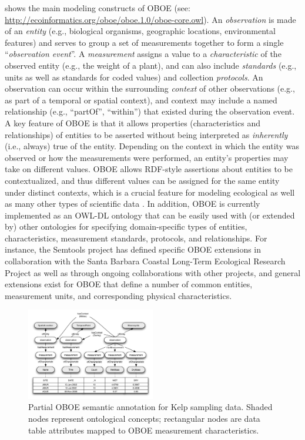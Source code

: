    shows the
main modeling constructs of OBOE (see:
\url{http://ecoinformatics.org/oboe/oboe.1.0/oboe-core.owl}). An {\em
  observation} is made of an {\em entity} (e.g., biological organisms,
geographic locations, environmental features) and serves to group a
set of measurements together to form a single ``\emph{observation
  event}''. A \emph{measurement} assigns a value to a {\em
  characteristic} of the observed entity (e.g., the weight of a
plant), and can also include \emph{standards} (e.g., units as well as
standards for coded values) and collection \emph{protocols}. An
observation can occur within the surrounding \emph{context} of other
observations (e.g., as part of a temporal or spatial context), and
context may include a named relationship (e.g., ``partOf'',
``within'') that existed during the observation event. A key feature
of OBOE is that it allows properties (characteristics and
relationships) of entities to be asserted without being interpreted as
\emph{inherently} (i.e., {always}) true of the entity.  Depending on
the context in which the entity was observed or how the measurements
were performed, an entity's properties may take on different values.
OBOE allows RDF-style assertions about entities to be contextualized,
and thus different values can be assigned for the same entity under
distinct contexts, which is a crucial feature for modeling ecological
as well as many other types of scientific data
\cite{bowers08,mungall07:_repres_phenot_in_owl}. In addition, OBOE is
currently implemented as an OWL-DL ontology that can be easily used
with (or extended by) other ontologies for specifying domain-specific
types of entities, characteristics, measurement standards, protocols,
and relationships. For instance, the Semtools project has defined
specific OBOE extensions in collaboration with the Santa Barbara
Coastal Long-Term Ecological Research Project as well as through
ongoing collaborations with other projects, and general extensions
exist for OBOE that define a number of common entities, measurement
units, and corresponding physical characteristics.

\begin{figure}[!b]
\centering
\includegraphics[width=0.5\textwidth]{images/kelp-mass-model.png}
\caption{Partial OBOE semantic annotation for Kelp sampling
  data. Shaded nodes represent ontological concepts; rectangular nodes
  are data table attributes mapped to OBOE measurement
  characteristics.}
\label{fig:kelp-mass-model}
\end{figure}

